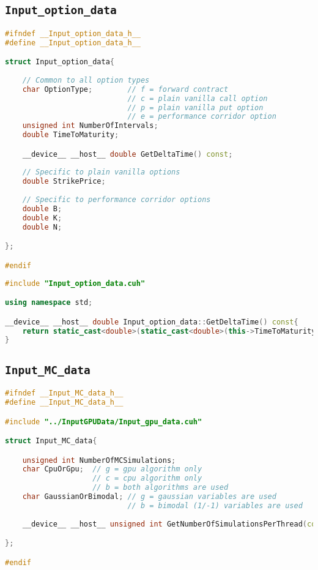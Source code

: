\subsection{\texttt{Input\_option\_data}}
\lipsum[1-3]

\begin{lstlisting}[language=C++, caption={\texttt{libraries/InputStructures/InputOptionData/Input\_option\_data.cuh}}]
#ifndef __Input_option_data_h__
#define __Input_option_data_h__

struct Input_option_data{
	
	// Common to all option types
	char OptionType;		// f = forward contract
							// c = plain vanilla call option
							// p = plain vanilla put option
							// e = performance corridor option
	unsigned int NumberOfIntervals;
	double TimeToMaturity;

	__device__ __host__ double GetDeltaTime() const;
	
	// Specific to plain vanilla options
	double StrikePrice;
		
	// Specific to performance corridor options
	double B;
	double K;
	double N;

};

#endif
\end{lstlisting}

\begin{lstlisting}[language=C++, caption={\texttt{libraries/InputStructures/InputOptionData/Input\_option\_data.cu}}]
#include "Input_option_data.cuh"

using namespace std;

__device__ __host__ double Input_option_data::GetDeltaTime() const{
	return static_cast<double>(static_cast<double>(this->TimeToMaturity) / static_cast<unsigned int>(this->NumberOfIntervals));	
}
\end{lstlisting}

\subsection{\texttt{Input\_MC\_data}}
\lipsum[1-3]

\begin{lstlisting}[language=C++, caption={\texttt{libraries/InputStructures/InputMCData/Input\_MC\_data.cuh}}]
#ifndef __Input_MC_data_h__
#define __Input_MC_data_h__

#include "../InputGPUData/Input_gpu_data.cuh"

struct Input_MC_data{

	unsigned int NumberOfMCSimulations;
	char CpuOrGpu;	// g = gpu algorithm only
					// c = cpu algorithm only
					// b = both algorithms are used
	char GaussianOrBimodal;	// g = gaussian variables are used
							// b = bimodal (1/-1) variables are used
	
	__device__ __host__ unsigned int GetNumberOfSimulationsPerThread(const Input_gpu_data&) const;

};

#endif
\end{lstlisting}

